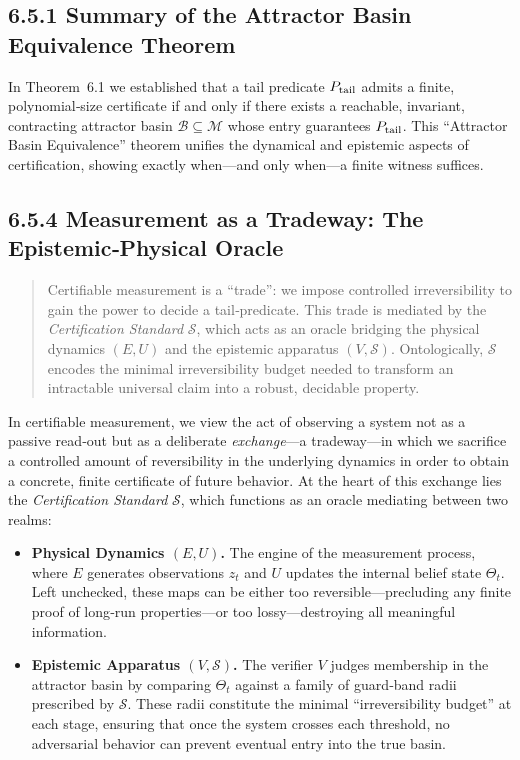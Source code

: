 \documentclass[12pt]{article}
\theoremstyle{definition}
\theoremstyle{plain}
\begin{document}
\subsection*{6.5.1 Summary of the Attractor Basin Equivalence Theorem}
In Theorem 6.1 we established that a tail predicate \(P_{\rm tail}\) admits a finite, polynomial‑size certificate if and only if there exists a reachable, invariant, contracting attractor basin \(\mathcal B\subseteq\mathcal M\) whose entry guarantees \(P_{\rm tail}\).  This “Attractor Basin Equivalence” theorem unifies the dynamical and epistemic aspects of certification, showing exactly when—and only when—a finite witness suffices.


\subsection*{6.5.4 Measurement as a Tradeway: The Epistemic‑Physical Oracle}
\begin{quote}
Certifiable measurement is a “trade”: we impose controlled irreversibility to gain the power to decide a tail‑predicate.  This trade is mediated by the \emph{Certification Standard} \(\mathcal S\), which acts as an oracle bridging the physical dynamics \((E,U)\) and the epistemic apparatus \((V,\mathcal S)\).  Ontologically, \(\mathcal S\) encodes the minimal irreversibility budget needed to transform an intractable universal claim into a robust, decidable property.
\end{quote}

In certifiable measurement, we view the act of observing a system not as a passive read‑out but as a deliberate \emph{exchange}—a tradeway—in which we sacrifice a controlled amount of reversibility in the underlying dynamics in order to obtain a concrete, finite certificate of future behavior.  At the heart of this exchange lies the \emph{Certification Standard} \(\mathcal S\), which functions as an oracle mediating between two realms:

\begin{itemize}
  \item \textbf{Physical Dynamics \((E,U)\).}  
    The engine of the measurement process, where \(E\) generates observations \(z_t\) and \(U\) updates the internal belief state \(\Theta_t\).  Left unchecked, these maps can be either too reversible—precluding any finite proof of long‑run properties—or too lossy—destroying all meaningful information.
  
  \item \textbf{Epistemic Apparatus \((V,\mathcal S)\).}  
    The verifier \(V\) judges membership in the attractor basin by comparing \(\Theta_t\) against a family of guard‐band radii prescribed by \(\mathcal S\).  These radii constitute the minimal “irreversibility budget” at each stage, ensuring that once the system crosses each threshold, no adversarial behavior can prevent eventual entry into the true basin.
\end{itemize}
\end{document}
